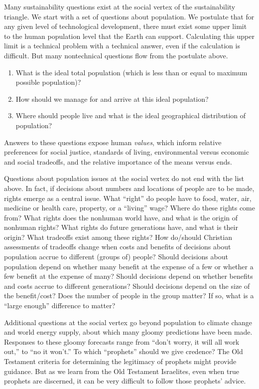 \documentclass[12pt]{article}
\begin{document}
Many sustainability questions exist at the social vertex of the sustainability triangle.
We start with a set of questions about population.
We postulate that
for any given level of technological development, 
there must exist some upper limit to the human population level that the Earth can support. 
Calculating this upper limit is a technical problem with a 
technical answer, 
even if the calculation is difficult.  
But many nontechnical questions flow from the postulate above.
%
\begin{enumerate}

  \item What is the ideal total population (which is less than or equal to maximum possible population)? 

  \item How should we manage for and arrive at this ideal population?
  
  \item Where should people live and what is the ideal geographical distribution of population?

\end{enumerate}
%
Answers to these questions expose human \emph{values}, which
inform relative preferences for 
social justice, 
standards of living, 
environmental versus economic and social tradeoffs, and 
the relative importance of the means versus ends.

Questions about population issues 
at the social vertex do not end with the list above.
In fact, if decisions about numbers and locations of people are to be made,
rights emerge as a central issue.
What ``right'' do people have to food, water, air, medicine or health care, property, or a ``living'' wage? 
Where do these rights come from? 
What rights does the nonhuman world have, and what is the origin of nonhuman rights?
What rights do future generations have, and what is their origin?
What tradeoffs exist among these rights?
How do/should Christian assessments of tradeoffs change when costs and benefits
of decisions about population accrue to different (groups of) people?
Should decisions about population depend on whether many benefit at the expense of a few or
whether a few benefit at the expense of many? 
Should decisions depend on whether benefits and costs accrue to different generations? 
Should decisions depend on the size of the benefit/cost? 
Does the number of people in the group matter? 
If so, what is a ``large enough'' difference to matter?

Additional questions at the social vertex go beyond population
to climate change and world energy supply, 
about which many gloomy predictions have been made.
Responses to these gloomy forecasts range from 
``don't worry, it will all work out,'' to ``no it won't.'' 
To which ``prophets'' should we give credence?  
The Old Testament criteria for determining the legitimacy of prophets might provide guidance.
But as we learn from the Old Testament Israelites, even when true prophets are discerned,
it can be very difficult to follow those prophets' advice. 
\end{document}
